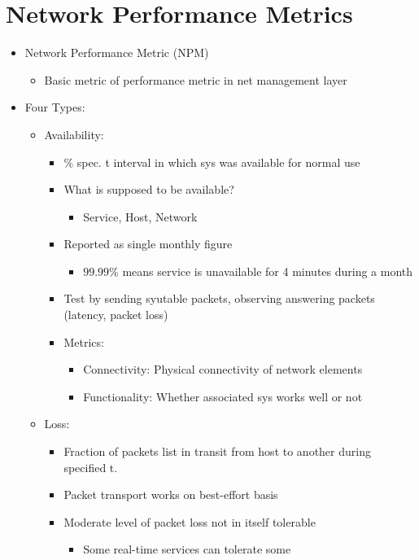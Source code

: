 \documentclass[a4paper]{article}
\begin{document}
\section{Network Performance Metrics}
\begin{itemize}
	\item Network Performance Metric (NPM)
	\begin{itemize}
		\item Basic metric of performance metric in net management layer
	\end{itemize}
	\item Four Types:
	\begin{itemize}
		\item Availability:
		\begin{itemize}
			\item $\%$ spec. t interval in which sys was available
				for normal use
			\item What is supposed to be available?
			\begin{itemize}
				\item Service, Host, Network
			\end{itemize}
			\item Reported as single monthly figure
			\begin{itemize}
				\item $99.99\%$ means service is unavailable for
					4 minutes during a month
			\end{itemize}
			\item Test by sending syutable packets, observing
				answering packets (latency, packet loss)
			\item Metrics:
			\begin{itemize}
				\item Connectivity: Physical connectivity of
					network elements
				\item Functionality: Whether associated sys
					works well or not
			\end{itemize}
		\end{itemize}
		\item Loss:
		\begin{itemize}
			\item Fraction of packets list in transit from host to
				another during specified t.
			\item Packet transport works on best-effort basis
			\item Moderate level of packet loss not in itself
				tolerable
			\begin{itemize}
				\item Some real-time services can tolerate some

\end{itemize}
\end{itemize}
\end{itemize}
\end{itemize}
\end{document}
